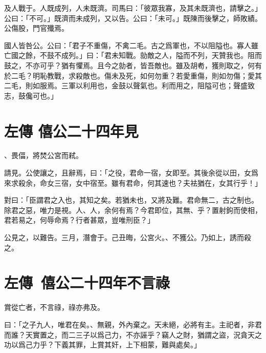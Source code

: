 及人戰于。人既成列，人未既濟。司馬曰：「彼眾我寡，及其未既濟也，請擊之。」公曰：「不可。」既濟而未成列，又以告。公曰：「未可。」既陳而後擊之，師敗績。公傷股，門官殲焉。

國人皆咎公。公曰：「君子不重傷，不禽二毛。古之爲軍也，不以阻隘也。寡人雖亡國之餘，不鼓不成列。」曰：「君未知戰。勍敵之人，隘而不列，天贊我也。阻而鼓之，不亦可乎？猶有懼焉。且今之勍者，皆吾敵也。雖及胡耇，獲則取之，何有於二毛？明恥教戰，求殺敵也。傷未及死，如何勿重？若愛重傷，則如勿傷；愛其二毛，則如服焉。三軍以利用也，金鼓以聲氣也。利而用之，阻隘可也；聲盛致志，鼓儳可也。」

\theendnotes

\section[寺人披見文公\quad{\small 左傳 僖公二十四年}]{{\normalsize 左傳 僖公二十四年}\quad {}見}
、畏偪，將焚公宮而弒。

請見。公使讓之，且辭焉，曰：「之役，君命一宿，女即至。其後余從以田，女爲來求殺余，命女三宿，女中宿至。雖有君命，何其速也？夫袪猶在，女其行乎！」

對曰：「臣謂君之入也，其知之矣。若猶未也，又將及難。君命無二，古之制也。除君之惡，唯力是視。人、人，余何有焉？今君即位，其無、乎？置射鉤而使相，君若易之，何辱命焉？行者甚眾，豈唯刑臣？」

公見之，以難告。三月，潛會于。己丑晦，公宮火。、不獲公。乃如上，誘而殺之。

\section[介之推不言祿\quad{\small 左傳\ 僖公二十四年}]{{\normalsize 左傳\ 僖公二十四年}\quad {}不言祿}
賞從亡者，不言祿，祿亦弗及。

曰：「之子九人，唯君在矣。、無親，外內棄之。天未絕，必將有主。主祀者，非君而誰？天實置之，而二三子以爲己力，不亦誣乎？竊人之財，猶謂之盜，況貪天之功以爲己力乎？下義其罪，上賞其奸，上下相蒙，難與處矣。」

